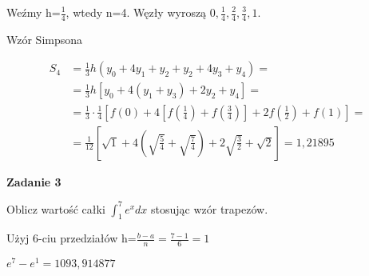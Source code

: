 \documentclass[11pt, a4paper]{article}
\begin{document}
Weźmy h=$\frac{1}{4}$, wtedy n=4. Węzły wyroszą $0, \frac{1}{4}, \frac{2}{4},\frac{3}{4}, 1$.

Wzór Simpsona

\begin{align*}
S_4&=\frac{1}{3}h\left(y_0+4y_1+y_2+y_2+4y_3+y_4\right)=\\
&=\frac{1}{3}h\left[y_0+4(y_1+y_3)+2y_2+y_4\right]=\\
&=\frac{1}{3}\cdot\frac{1}{4}\left[f(0)+4\left[f(\frac{1}{4})+f(\frac{3}{4})\right]+2f(\frac{1}{2})+f(1)\right]=\\
&=\frac{1}{12}\left[\sqrt{1}+4\left(\sqrt{\frac{5}{4}}+\sqrt{\frac{7}{4}}\right)+2\sqrt{\frac{3}{2}}+\sqrt{2}\right]=1,21895
\end{align*}

\textbf{Zadanie 3}

Oblicz wartość całki $\int_1^7e^xdx$ stosując wzór trapezów.

Użyj 6-ciu przedziałów h=$\frac{b-a}{n}=\frac{7-1}{6}=1$

$e^7-e^1=1093,914877$
\end{document}

